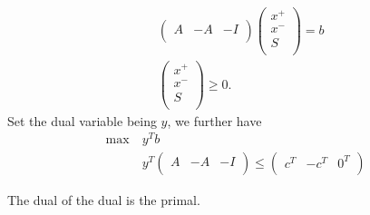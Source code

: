 \begin{eg}
\begin{align*}
		      & \begin{pmatrix}
			        A & -A & -I \\
		        \end{pmatrix}\begin{pmatrix}
			                     x^+ \\
			                     x^- \\
			                     S   \\
		                     \end{pmatrix} = b \\
		      & \begin{pmatrix}
			        x^+ \\
			        x^- \\
			        S   \\
		        \end{pmatrix}\geq 0.
	\end{align*}
	Set the dual variable being \(y\), we further have
	\begin{align*}
		\max~ & y^{T}b                                          \\
		      & y^{T} \begin{pmatrix}
			              A & -A & -I \\
		              \end{pmatrix} \leq \begin{pmatrix}
			                                 c^{T} & -c^{T} & 0^{T} \\
		                                 \end{pmatrix}
	\end{align*}


\end{eg}

\begin{note}
	The dual of the dual is the primal.
\end{note}
